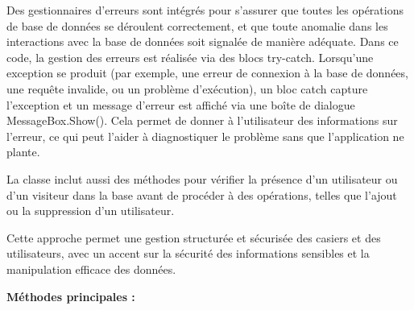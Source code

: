 \documentclass[main.tex]{subfiles}
\begin{document}
Des gestionnaires d'erreurs sont intégrés pour s'assurer que toutes les opérations de base de données se déroulent correctement, et que toute anomalie dans les interactions avec la base de données soit signalée de manière adéquate. Dans ce code, la gestion des erreurs est réalisée via des blocs try-catch. Lorsqu'une exception se produit (par exemple, une erreur de connexion à la base de données, une requête invalide, ou un problème d'exécution), un bloc catch capture l'exception et un message d'erreur est affiché via une boîte de dialogue MessageBox.Show(). Cela permet de donner à l'utilisateur des informations sur l'erreur, ce qui peut l'aider à diagnostiquer le problème sans que l'application ne plante.  

La classe inclut aussi des méthodes pour vérifier la présence d'un utilisateur ou d'un visiteur dans la base avant de procéder à des opérations, telles que l'ajout ou la suppression d'un utilisateur. 

Cette approche permet une gestion structurée et sécurisée des casiers et des utilisateurs, avec un accent sur la sécurité des informations sensibles et la manipulation efficace des données. 

\textbf{Méthodes principales : }
\end{document}
